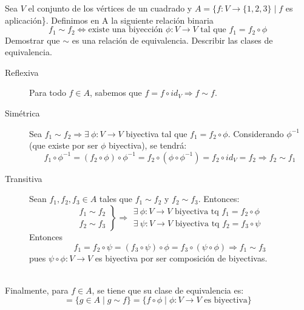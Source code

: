 \documentclass[12pt]{article}
\begin{document}
    \begin{ejercicio}[1.25 puntos]
        Sea $V$ el conjunto de los vértices de un cuadrado y $A = \{f : V \rightarrow \{1, 2, 3\} \mid f $ es aplicación\}. Definimos en A la siguiente relación binaria
        \begin{equation*}
            f_1 \sim f_2 \Longleftrightarrow \text{existe una biyección } \phi : V \rightarrow V \text{ tal que } f_1 = f_2 \circ \phi 
        \end{equation*}
        Demostrar que $\sim$ es una relación de equivalencia. Describir las clases de equivalencia.
        \begin{description}
            \item[Reflexiva] Para todo $f \in A$, sabemos que $f = f \circ id_V \Rightarrow f \sim f$.
            \item[Simétrica] Sea $f_1 \sim f_2 \Rightarrow \exists \ \phi : V \rightarrow V$ biyectiva tal que $f_1 = f_2 \circ \phi$. Considerando $\phi^{-1}$ (que existe por ser $\phi$ biyectiva), se tendrá:
            \begin{equation*}
                f_1 \circ \phi^{-1} = (f_2 \circ \phi) \circ \phi^{-1} = f_2 \circ (\phi \circ \phi^{-1}) = f_2 \circ id_V = f_2 \Rightarrow f_2 \sim f_1
            \end{equation*}
            \item[Transitiva] Sean $f_1, f_2, f_3 \in A$ tales que $f_1 \sim f_2$ y $f_2 \sim f_3$. Entonces:
            \begin{equation*}
                \left.\begin{array}{l}
                     f_1 \sim f_2 \\
                     f_2 \sim f_3 
                \end{array}\right\} \Rightarrow
                \begin{array}{l}
                     \exists \ \phi: V \rightarrow V \text{ biyectiva tq } f_1 = f_2 \circ \phi \\
                     \exists \ \psi :V \rightarrow V \text{ biyectiva tq } f_2 = f_3 \circ \psi
                \end{array}
             \end{equation*}
            Entonces
            \begin{equation*}
                f_1 = f_2 \circ \psi = (f_3 \circ \psi) \circ \phi = f_3 \circ (\psi \circ \phi) \Rightarrow f_1 \sim f_3
            \end{equation*}
            pues $\psi \circ \phi:V \rightarrow V$ es biyectiva por ser composición de biyectivas.
        \end{description}~\\

        Finalmente, para $f \in A$, se tiene que su clase de equivalencia es:
        \begin{equation*}
            [f] = \{g \in A \mid g \sim f\} = \{f \circ \phi \mid \phi:V \rightarrow V \text{ es biyectiva}\}
        \end{equation*}
    \end{ejercicio}
\end{document}
